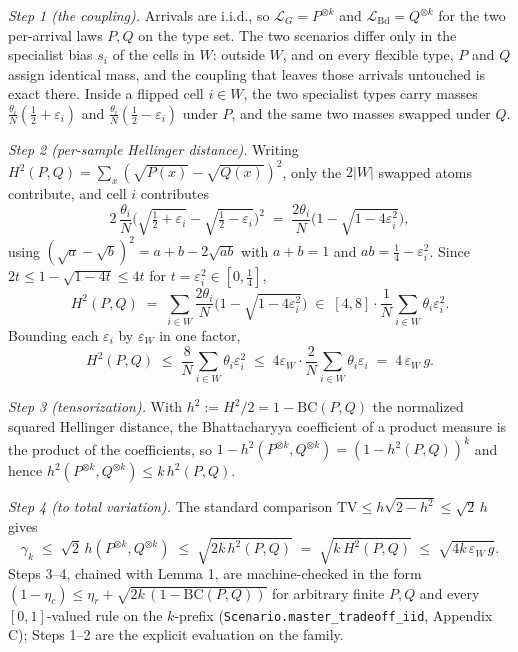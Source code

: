 \emph{Step 1 (the coupling).} Arrivals are i.i.d., so
\(\mathcal L_G = P^{\otimes k}\) and
\(\mathcal L_{\mathrm{Bd}} = Q^{\otimes k}\) for the two per-arrival
laws \(P,Q\) on the type set. The two scenarios differ only in the
specialist bias \(s_i\) of the cells in \(W\): outside \(W\), and on
every flexible type, \(P\) and \(Q\) assign identical mass, and the
coupling that leaves those arrivals untouched is exact there. Inside a
flipped cell \(i\in W\), the two specialist types carry masses
\(\tfrac{\theta_i}{N}(\tfrac12+\varepsilon_i)\) and
\(\tfrac{\theta_i}{N}(\tfrac12-\varepsilon_i)\) under \(P\), and the
same two masses swapped under \(Q\).

\emph{Step 2 (per-sample Hellinger distance).} Writing
\(H^2(P,Q)=\sum_x(\sqrt{P(x)}-\sqrt{Q(x)})^2\), only the \(2|W|\)
swapped atoms contribute, and cell \(i\) contributes
\[2\,\frac{\theta_i}{N}\Big(\sqrt{\tfrac12+\varepsilon_i}-\sqrt{\tfrac12-\varepsilon_i}\Big)^{2}
\;=\; \frac{2\theta_i}{N}\Big(1-\sqrt{1-4\varepsilon_i^{2}}\Big),\]
using \((\sqrt a-\sqrt b)^2 = a+b-2\sqrt{ab}\) with \(a+b=1\) and
\(ab=\tfrac14-\varepsilon_i^2\). Since \(2t \le 1-\sqrt{1-4t} \le 4t\)
for \(t=\varepsilon_i^2\in[0,\tfrac14]\),
\[H^2(P,Q) \;=\; \sum_{i\in W}\frac{2\theta_i}{N}\Big(1-\sqrt{1-4\varepsilon_i^{2}}\Big)
\;\in\; [4,8]\cdot\frac{1}{N}\sum_{i\in W}\theta_i\varepsilon_i^{2}.\]
Bounding each \(\varepsilon_i\) by \(\varepsilon_W\) in one factor,
\[H^2(P,Q) \;\le\; \frac{8}{N}\sum_{i\in W}\theta_i\varepsilon_i^{2}
\;\le\; 4\varepsilon_W\cdot\frac{2}{N}\sum_{i\in W}\theta_i\varepsilon_i
\;=\; 4\,\varepsilon_W\,g .\]

\emph{Step 3 (tensorization).} With
\(h^2 := H^2/2 = 1-\mathrm{BC}(P,Q)\) the normalized squared Hellinger
distance, the Bhattacharyya coefficient of a product measure is the
product of the coefficients, so
\(1-h^2(P^{\otimes k},Q^{\otimes k}) = (1-h^2(P,Q))^k\) and hence
\(h^2(P^{\otimes k},Q^{\otimes k}) \le k\,h^2(P,Q)\).

\emph{Step 4 (to total variation).} The standard comparison
\(\mathrm{TV}\le h\sqrt{2-h^{2}}\le\sqrt2\,h\) gives
\[\gamma_k \;\le\; \sqrt2\,h(P^{\otimes k},Q^{\otimes k}) \;\le\; \sqrt{2k\,h^2(P,Q)}
\;=\; \sqrt{k\,H^2(P,Q)} \;\le\; \sqrt{4k\,\varepsilon_W\,g}.\] Steps
3--4, chained with Lemma 1, are machine-checked in the form
\((1-\eta_c)\le\eta_r+\sqrt{2k\,(1-\mathrm{BC}(P,Q))}\) for arbitrary
finite \(P,Q\) and every \([0,1]\)-valued rule on the \(k\)-prefix
(\texttt{Scenario.master\_tradeoff\_iid}, Appendix C); Steps 1--2 are
the explicit evaluation on the family.

